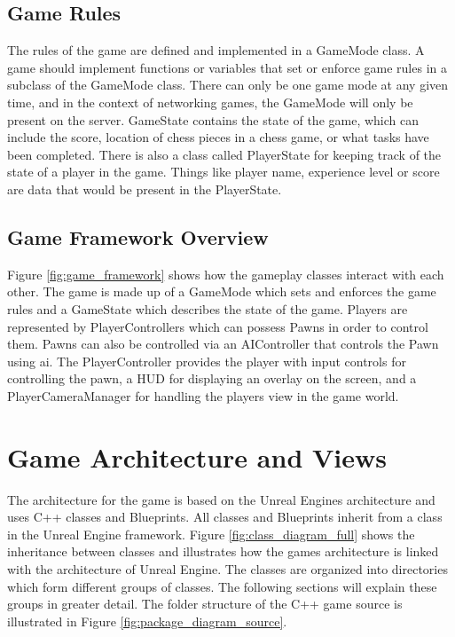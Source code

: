 \subsection{Game Rules}
The rules of the game are defined and implemented in a GameMode class. A game should implement functions or variables that set or enforce game rules in a subclass of the GameMode class. There can only be one game mode at any given time, and in the context of networking games, the GameMode will only be present on the server. GameState contains the state of the game, which can include the score, location of chess pieces in a chess game, or what tasks have been completed. There is also a class called PlayerState for keeping track of the state of a player in the game. Things like player name, experience level or score are data that would be present in the PlayerState.

\subsection{Game Framework Overview}
Figure \ref{fig:game_framework} shows how the gameplay classes interact with each other. The game is made up of a GameMode which sets and enforces the game rules and a GameState which describes the state of the game. Players are represented by PlayerControllers which can possess Pawns in order to control them. Pawns can also be controlled via an AIController that controls the Pawn using \gls{ai}. The PlayerController provides the player with input controls for controlling the pawn, a HUD for displaying an overlay on the screen, and a PlayerCameraManager for handling the players view in the game world.



\section{Game Architecture and Views}
The architecture for the game is based on the Unreal Engines architecture and uses C++ classes and Blueprints. All classes and Blueprints inherit from a class in the Unreal Engine framework. Figure \ref{fig:class_diagram_full} shows the inheritance between classes and illustrates how the games architecture is linked with the architecture of Unreal Engine. The classes are organized into directories which form different groups of classes. The following sections will explain these groups in greater detail. The folder structure of the C++ game source is illustrated in Figure \ref{fig:package_diagram_source}.

